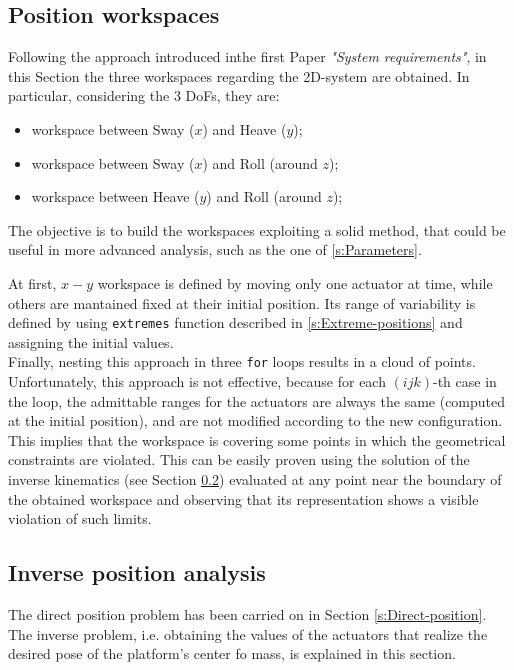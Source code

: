 \documentclass[10.5pt, twocolumn]{article}
\begin{document}
\subsection{Position workspaces}
\label{s:Position-workspaces}
Following the approach introduced inthe first Paper \textit{"System requirements"}, in this Section the three workspaces regarding the 2D-system are obtained. In particular, considering the 3 DoFs, they are:
{\begin{itemize}
  \item workspace between Sway (\( x \)) and Heave (\( y \));
  \item workspace between Sway (\( x \)) and Roll (around \( z \));
  \item workspace between Heave (\( y \)) and Roll (around \( z \));
\end{itemize}

The objective is to build the workspaces exploiting a solid method, that could be useful in more advanced analysis, such as the one of \ref{s:Parameters}.

At first, \( x-y\) workspace is defined by moving only one actuator at time, while others are mantained fixed at their initial position. Its range of variability is defined by using \texttt{extremes} function described in \ref{s:Extreme-positions} and assigning the initial values.\\
Finally, nesting this approach in three \texttt{for} loops results in a cloud of points. Unfortunately, this approach is not effective, because for each \( (i j k) \)-th case in the loop, the admittable ranges for the actuators are always the same (computed at the initial position), and are not modified according to the new configuration.\\
This implies that the workspace is covering some points in which the geometrical constraints are violated. This can be easily proven using the solution of the inverse kinematics (see Section \ref{s:Inverse-position}) evaluated at any point near the boundary of the obtained workspace and observing that its representation shows a visible violation of such limits.
\subsection{Inverse position analysis}
\label{s:Inverse-position}
The direct position problem has been carried on in Section \ref{s:Direct-position}. The inverse problem, i.e. obtaining the values of the actuators that realize the desired pose of the platform's center fo mass, is explained in this section.

}
\end{document}

